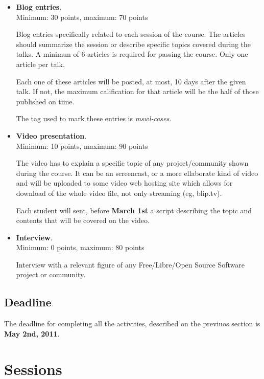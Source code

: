 \documentclass[a4paper]{article}
\begin{document}
\begin{itemize}

\item \textbf{Blog entries}. \\
  Minimum: 30 points, maximum: 70 points

  Blog entries specifically related to each session of the course. The articles 
should summarize the session or describe specific topics covered during the talks.
A minimun of 6 articles is required for passing the course. Only one article 
per talk. 

 Each one of these articles will be posted, at most, 10 days after the 
given talk. If not, the maximum calification for that article will be the half
of those published on time.
  
 The tag used to mark these entries is \textit{mswl-cases}.

\item \textbf{Video presentation}. \\
  Minimum: 10 points, maximum: 90 points 

  The video has to explain a specific topic of any project/community shown during the course. 
It can be an screencast, or a more ellaborate kind of video and will be uploaded 
to some video web hosting site which allows for download of the whole video file, 
not only streaming (eg, blip.tv).
  
  Each student will sent, before \textbf{March 1st} a script describing the topic and contents 
that will be covered on the video.

\item \textbf{Interview}. \\
  Minimum: 0 points, maximum: 80 points
  
  Interview with a relevant figure of any Free/Libre/Open Source Software project or community. 


\end{itemize}

\subsection{Deadline}

The deadline for completing all the activities, described on the previuos section is \textbf{May 2nd, 2011}.


\section{Sessions}
\end{document}

